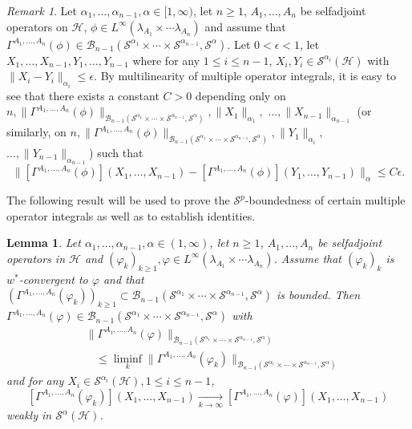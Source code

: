 \documentclass[12pt]{amsart}
\newtheorem{lemma}[theorem]{Lemma}
\theoremstyle{remark}
\newtheorem{remark}[theorem]{Remark}
\begin{document}
\begin{remark}\label{Ineqmulti}
Let $\alpha_1, \ldots, \alpha_{n-1}, \alpha \in [1, \infty)$, let $n \geq 1$, $A_1, \ldots, A_n$ be selfadjoint operators on $\mathcal{H}$, $\phi \in L^{\infty}(\lambda_{A_1} \times \cdots \lambda_{A_n})$ and assume that $\Gamma^{A_1, \ldots, A_n}(\phi) \in \mathcal{B}_{n-1}(\mathcal{S}^{\alpha_1} \times \cdots \times \mathcal{S}^{\alpha_{n-1}}, \mathcal{S}^{\alpha})$. Let $0 < \epsilon < 1$, let $X_1, \ldots, X_{n-1}, Y_1, \ldots, Y_{n-1}$ where for any $1 \leq i \leq n-1$, $X_i, Y_i\in \mathcal{S}^{\alpha_i}(\mathcal{H})$ with $\|X_i - Y_i \|_{\alpha_i} \leq \epsilon$. By multilinearity of multiple operator integrals, it is easy to see that there exists a constant $C > 0$ depending only on $n, \|\Gamma^{A_1, \ldots, A_n}(\phi)\|_{\mathcal{B}_{n-1}(\mathcal{S}^{\alpha_1} \times \cdots \times \mathcal{S}^{\alpha_{n-1}}, \mathcal{S}^{\alpha})}, \|X_1\|_{\alpha_1},$ $\ldots, \|X_{n-1}\|_{\alpha_{n-1}}$ (or similarly, on $n, \|\Gamma^{A_1, \ldots, A_n}(\phi)\|_{\mathcal{B}_{n-1}(\mathcal{S}^{\alpha_1} \times \cdots \times \mathcal{S}^{\alpha_{n-1}}, \mathcal{S}^{\alpha})}, \|Y_1\|_{\alpha_i},$ $\ldots, \|Y_{n-1}\|_{\alpha_{n-1}}$) such that
$$
\| \left[ \Gamma^{A_1, \ldots, A_n}(\phi) \right](X_1, \ldots, X_{n-1}) - \left[ \Gamma^{A_1, \ldots, A_n}(\phi) \right](Y_1, \ldots, Y_{n-1}) \|_{\alpha} \leq C \epsilon. 
$$
\end{remark}

The following result will be used to prove the $\mathcal{S}^p$-boundedness of certain multiple operator integrals as well as to establish identities.

\begin{lemma}\label{LemmeUB}
Let $\alpha_1, \ldots, \alpha_{n-1}, \alpha \in (1, \infty)$, let $n \geq 1$, $A_1, \ldots, A_n$ be selfadjoint operators in $\mathcal{H}$ and $(\varphi_k)_{k\geq 1}, \varphi \in L^{\infty}(\lambda_{A_1} \times \cdots \lambda_{A_n})$. Assume that $(\varphi_k)_k$ is $w^*$-convergent to $\varphi$ and that $\left(\Gamma^{A_1, \ldots, A_n}(\varphi_k) \right)_{k\geq 1} \subset \mathcal{B}_{n-1}(\mathcal{S}^{\alpha_1} \times \cdots \times \mathcal{S}^{\alpha_{n-1}}, \mathcal{S}^{\alpha})$ is bounded. Then $\Gamma^{A_1, \ldots, A_n}(\varphi) \in \mathcal{B}_{n-1}(\mathcal{S}^{\alpha_1} \times \cdots \times \mathcal{S}^{\alpha_{n-1}}, \mathcal{S}^{\alpha})$ with
\begin{align*}
& \| \Gamma^{A_1, \ldots, A_n}(\varphi)\|_{\mathcal{B}_{n-1}(\mathcal{S}^{\alpha_1} \times \cdots \times \mathcal{S}^{\alpha_{n-1}}, \mathcal{S}^{\alpha})} \\
& \ \ \ \ \leq \liminf_k \| \Gamma^{A_1, \ldots, A_n}(\varphi_k)\|_{\mathcal{B}_{n-1}(\mathcal{S}^{\alpha_1} \times \cdots \times \mathcal{S}^{\alpha_{n-1}}, \mathcal{S}^{\alpha})}
\end{align*}
and for any $X_i \in \mathcal{S}^{\alpha_i}(\mathcal{H}), 1 \leq i \leq n-1$,
$$
\left[ \Gamma^{A_1, \ldots, A_n}(\varphi_k) \right](X_1, \ldots, X_{n-1}) \underset{k \to \infty}{\longrightarrow} \left[ \Gamma^{A_1, \ldots, A_n}(\varphi) \right](X_1, \ldots, X_{n-1})
$$
weakly in $\mathcal{S}^{\alpha}(\mathcal{H})$.
\end{lemma}
\end{document}
